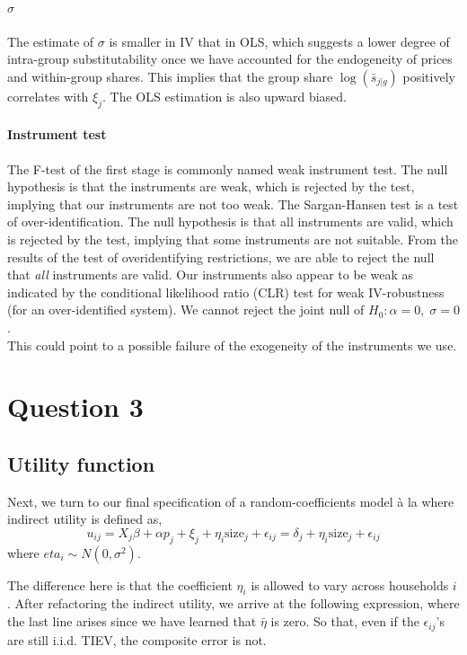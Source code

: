 \documentclass[12pt]{article}
\begin{document}
\paragraph{$\hat{\sigma}$} The estimate of $\sigma$ is smaller in IV that in OLS, which suggests a lower degree of intra-group substitutability once we have accounted for the endogeneity of prices and within-group shares.
This implies that the group share $\log(\bar{s}_{j|g})$ positively correlates with
$\xi_j$. The OLS estimation is also upward biased.

\paragraph{Instrument test}
The F-test of the first stage is commonly named weak instrument test. The null
hypothesis is that the instruments are weak, which is rejected by the test,
implying that our instruments are not too weak. The Sargan-Hansen test is a
test of over-identification. The null hypothesis is that all instruments are
valid, which is rejected by the test, implying that some instruments are not
suitable.
From the results of the test of overidentifying restrictions, we are able to
reject the null that \textit{all} instruments are valid. Our instruments also
appear to be weak as indicated by the conditional likelihood ratio (CLR) test
for weak IV-robustness (for an over-identified system). We cannot reject the
joint null of $H_0: \alpha=0, \; \sigma=0$. \\ This could point to a possible
failure of the exogeneity of the instruments we use.

\section{Question 3}
\subsection{Utility function}
Next, we turn to our final specification of a random-coefficients model à la
\citet{berrylevinsohnpakes1995} where indirect utility is defined as,
\begin{equation}
    u_{ij}=X_{j}\beta + \alpha p_{j} + \xi_{j}+ \eta_i\text{size}_j+ \epsilon_{ij}=\delta_j+\eta_i\text{size}_j+\epsilon_{ij}
\end{equation}
where $eta_i\sim N(0,\sigma^2)$.

The difference here is that the coefficient $\eta_i$ is allowed to vary across
households $i$. After refactoring the indirect utility, we arrive at the
following expression, where the last line arises since we have learned that
$\bar{\eta}$ is zero. So that, even if the $\epsilon_{ij}$'s are still i.i.d.
TIEV, the composite error is not.
\end{document}
